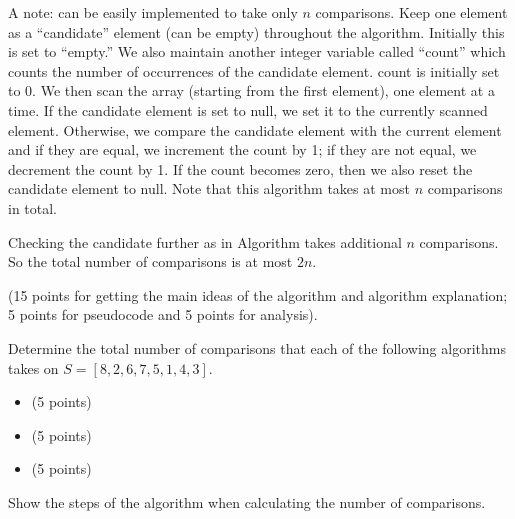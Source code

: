 \documentclass[final]{article}
\begin{document}
\begin{solution}
    A note:  can  be easily implemented to take only $n$ comparisons. Keep
    one element as a ``candidate'' element  (can be empty) throughout the algorithm. Initially this is set  to ``empty.''
    We also maintain another integer variable called ``count'' which counts the number of occurrences
    of the candidate element.  count is initially set to 0. We then scan the  array (starting from the first element), one
    element at a time. If the candidate element is set to null, we set it to the currently scanned element.
    Otherwise, we compare the candidate element with the current element and if they are equal, we increment
    the count by 1; if they are not equal, we decrement the count by 1. If the count becomes zero, then
    we also reset the candidate element to null.  Note that this algorithm takes at most $n$ comparisons in total.

    Checking the candidate further as in  Algorithm  takes additional $n$ comparisons.
    So the total number of comparisons is at most $2n$.

    (15 points for getting the main ideas of the algorithm and algorithm explanation; 5 points for pseudocode
    and 5 points for analysis).


\end{solution}

\begin{exercise}{5.1}
    Determine the total number of comparisons that each of the following algorithms takes on $S = [8, 2, 6, 7, 5, 1, 4, 3]$.
    \begin{itemize}[nosep]
        \item {} (5 points)
        \item {} (5 points)
        \item {}  (5 points)
    \end{itemize}
    Show the steps of the algorithm when calculating the number of comparisons.
\end{exercise}
\end{document}
